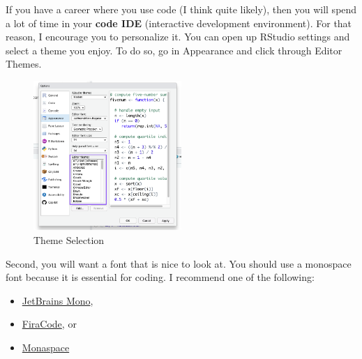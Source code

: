 \documentclass[12pt]{article}
\begin{document}
If you have a career where you use code (I think quite likely), then you will spend a lot of time in your \textbf{code IDE} (interactive development environment). For that reason, I encourage you to personalize it. 
You can open up RStudio settings and select a theme you enjoy. 
To do so, go in Appearance and click through Editor Themes. 

\begin{figure}[!ht]
  \caption{Theme Selection}
  \label{fig:rstudio_theme}
  \centering
  \includegraphics[width = 0.5\textwidth]{figures/rstudio_theme.png}
\end{figure}

Second, you will want a font that is nice to look at. 
You should use a monospace font because it is essential for coding. 
I recommend one of the following:
\begin{itemize}
  \item \href{https://www.jetbrains.com/lp/mono/}{JetBrains Mono},
  \item \href{https://github.com/tonsky/FiraCode}{FiraCode}, or
  \item \href{https://monaspace.githubnext.com}{Monaspace}
\end{itemize}
\end{document}
